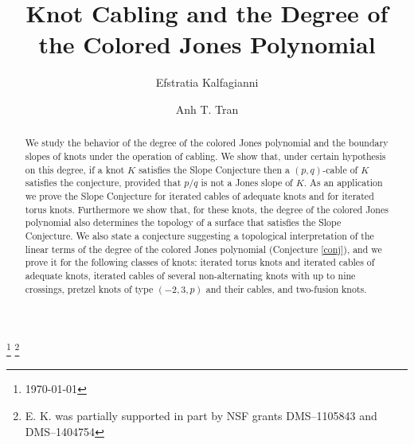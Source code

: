 \documentclass[11pt]{amsart}
\theoremstyle{definition}
\begin{document}
\title[]{Knot Cabling and the Degree of the Colored Jones Polynomial}

\author[]{Efstratia Kalfagianni}
\address{Department of Mathematics, Michigan State University, East Lansing, MI, 48824}

\author[]{Anh T. Tran}
\address{Department of Mathematical Sciences, University of Texas at Dallas,  Richardson, TX, 75080}
\bigskip

\bigskip

\begin{abstract} We study the behavior of   the degree of the colored Jones polynomial and the boundary slopes of knots under  the operation of cabling. We show that, under certain hypothesis on this degree, if a knot $K$ satisfies the Slope Conjecture then a $(p, q)$-cable of $K$ satisfies the conjecture,
provided that $p/q$ is not a Jones slope of $K$.
As an application we  prove the Slope Conjecture for iterated cables of adequate knots and for iterated torus knots.
Furthermore we show that, for these knots, the degree of the  colored Jones polynomial also
determines the topology of a surface that satisfies the Slope Conjecture.
We also state a conjecture   suggesting a topological interpretation of 
 the linear terms of the degree of the colored Jones polynomial (Conjecture \ref{conj}), and we prove it for the following classes of knots:
 iterated  torus knots and iterated cables of adequate knots, iterated cables
of several non-alternating knots with up to nine crossings, pretzel knots of type $(-2, 3, p)$ and their cables, and two-fusion knots.


\bigskip

\bigskip

\end{abstract}
\thanks {\today}
\thanks{E. K. was partially supported in part by NSF grants DMS--1105843 and DMS--1404754}


\maketitle
\end{document}
